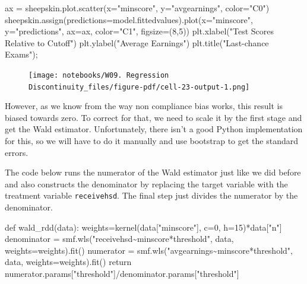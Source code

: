 \documentclass[
  letterpaper,
  DIV=11,
  numbers=noendperiod]{scrreprt}
\newenvironment{Shaded}{\begin{snugshade}}{\end{snugshade}}
\newcommand{\ControlFlowTok}[1]{\textcolor[rgb]{0.00,0.23,0.31}{#1}}
\newcommand{\DecValTok}[1]{\textcolor[rgb]{0.68,0.00,0.00}{#1}}
\newcommand{\KeywordTok}[1]{\textcolor[rgb]{0.00,0.23,0.31}{#1}}
\newcommand{\NormalTok}[1]{\textcolor[rgb]{0.00,0.23,0.31}{#1}}
\newcommand{\OperatorTok}[1]{\textcolor[rgb]{0.37,0.37,0.37}{#1}}
\newcommand{\StringTok}[1]{\textcolor[rgb]{0.13,0.47,0.30}{#1}}
\begin{document}
\begin{Shaded}
\begin{Highlighting}[]
\NormalTok{ax }\OperatorTok{=}\NormalTok{ sheepskin.plot.scatter(x}\OperatorTok{=}\StringTok{"minscore"}\NormalTok{, y}\OperatorTok{=}\StringTok{"avgearnings"}\NormalTok{, color}\OperatorTok{=}\StringTok{"C0"}\NormalTok{)}
\NormalTok{sheepskin.assign(predictions}\OperatorTok{=}\NormalTok{model.fittedvalues).plot(x}\OperatorTok{=}\StringTok{"minscore"}\NormalTok{, y}\OperatorTok{=}\StringTok{"predictions"}\NormalTok{, ax}\OperatorTok{=}\NormalTok{ax, color}\OperatorTok{=}\StringTok{"C1"}\NormalTok{, figsize}\OperatorTok{=}\NormalTok{(}\DecValTok{8}\NormalTok{,}\DecValTok{5}\NormalTok{))}
\NormalTok{plt.xlabel(}\StringTok{"Test Scores Relative to Cutoff"}\NormalTok{)}
\NormalTok{plt.ylabel(}\StringTok{"Average Earnings"}\NormalTok{)}
\NormalTok{plt.title(}\StringTok{"Last{-}chance Exams"}\NormalTok{)}\OperatorTok{;}
\end{Highlighting}
\end{Shaded}

\begin{figure}[H]

{\centering \texttt{[image: notebooks/W09. Regression Discontinuity\_files/figure-pdf/cell-23-output-1.png]}

}

\end{figure}

However, as we know from the way non compliance bias works, this result
is biased towards zero. To correct for that, we need to scale it by the
first stage and get the Wald estimator. Unfortunately, there isn't a
good Python implementation for this, so we will have to do it manually
and use bootstrap to get the standard errors.

The code below runs the numerator of the Wald estimator just like we did
before and also constructs the denominator by replacing the target
variable with the treatment variable \texttt{receivehsd}. The final step
just divides the numerator by the denominator.

\begin{Shaded}
\begin{Highlighting}[]
\KeywordTok{def}\NormalTok{ wald\_rdd(data):}
\NormalTok{    weights}\OperatorTok{=}\NormalTok{kernel(data[}\StringTok{"minscore"}\NormalTok{], c}\OperatorTok{=}\DecValTok{0}\NormalTok{, h}\OperatorTok{=}\DecValTok{15}\NormalTok{)}\OperatorTok{*}\NormalTok{data[}\StringTok{"n"}\NormalTok{]}
\NormalTok{    denominator }\OperatorTok{=}\NormalTok{ smf.wls(}\StringTok{"receivehsd\textasciitilde{}minscore*threshold"}\NormalTok{, data, weights}\OperatorTok{=}\NormalTok{weights).fit()}
\NormalTok{    numerator }\OperatorTok{=}\NormalTok{ smf.wls(}\StringTok{"avgearnings\textasciitilde{}minscore*threshold"}\NormalTok{, data, weights}\OperatorTok{=}\NormalTok{weights).fit()}
    \ControlFlowTok{return}\NormalTok{ numerator.params[}\StringTok{"threshold"}\NormalTok{]}\OperatorTok{/}\NormalTok{denominator.params[}\StringTok{"threshold"}\NormalTok{]}
\end{Highlighting}
\end{Shaded}
\end{document}

